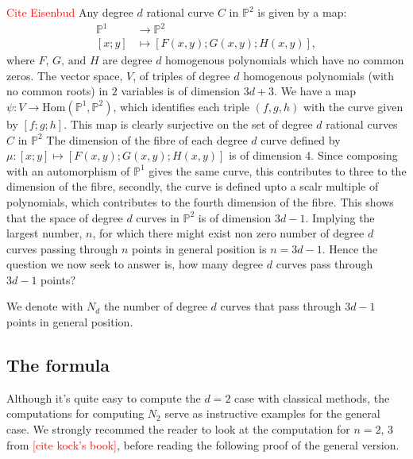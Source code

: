 \begin{remark}
    \label{why3d1points}
 \textcolor{red}{Cite Eisenbud}
Any degree $d$ rational curve $C$ in $\mathbb{P}^{2}$ is given by a map:
\begin{align*}
    \mathbb{P}^{1} &\to \mathbb{P}^{2}\\
    [x;y] &\mapsto [F(x,y);G(x,y);H(x,y)],
\end{align*}
where $F,\,G,\,\text{and }H$ are degree $d$ homogenous polynomials which have no common zeros.
The vector space, $V$, of triples of degree $d$ homogenous polynomials (with no common roots) in $2$ variables is of dimension $3d+3$.
We have a map $\psi: V \to \text{Hom}(\mathbb{P}^{1}, \mathbb{P}^{2})$, which identifies each triple $(f,g,h)$ with the curve given by $[f;g;h]$.
This map is clearly surjective on the set of degree $d$ rational curves $C$ in $\mathbb{P}^{2}$
The dimension of the fibre of each degree $d$ curve defined by $\mu : [x;y] \mapsto [F(x,y);G(x,y);H(x,y)]$ is of dimension 4.
Since composing with an automorphism of $\mathbb{P}^{1}$ gives the same curve, this contributes to three to the dimension of the fibre, secondly, the curve is defined upto a scalr multiple of polynomials, which contributes to the fourth dimension of the fibre.
This shows that the space of degree $d$ curves in $\mathbb{P}^{2}$ is of dimension $3d-1$.
Implying the largest number, $n$, for which there might exist non zero number of degree $d$ curves passing through $n$ points in general position is $n = 3d-1$.
Hence the question we now seek to answer is, how many degree $d$ curves pass through $3d-1$ points?
   
\end{remark}

\begin{definition}
    We denote with $N_{d}$ the number of degree $d$ curves that pass through $3d-1$ points in general position.
\end{definition}

\subsection{The formula}

Although it's quite easy to compute the $d = 2$ case with classical methods, the computations for computing $N_{2}$ serve as instructive examples for the general case.
We strongly recommed the reader to look at the computation for $n=2,\,3$ from \textcolor{red}{[cite kock's book]}, before reading the following proof of the general version.

